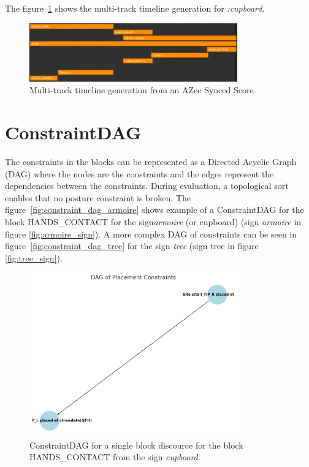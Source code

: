 \documentclass[../../main.tex]{subfiles}
\begin{document}
The figure~\ref{fig:azee_timeline} shows the multi-track timeline generation for \emph{:cupboard}.

\begin{figure}[h]
    \centering
    \includegraphics[width=0.8\textwidth]{chapters/multi_track/images/azee_timeline.png}
    \caption{Multi-track timeline generation from an AZee Synced Score.}
    \label{fig:azee_timeline}
\end{figure}


\section{ConstraintDAG}
\label{ch:multi_track:constraint_dag}



The constraints in the blocks can be represented as a Directed Acyclic Graph (DAG) where the nodes are the constraints and the edges represent the dependencies between the constraints. During evaluation, a topological sort enables that no posture constraint is broken. The figure~\ref{fig:constraint_dag_armoire} shows example of a ConstraintDAG for the block HANDS_CONTACT for the sign\emph{armoire} (or cupboard) (sign \emph{armoire} in figure \ref{fig:armoire_sign}). A more complex DAG of constraints can be seen in figure~\ref{fig:constraint_dag_tree} for the sign \emph{tree} (sign tree in figure \ref{fig:tree_sign}).

\begin{figure}[h]
    \centering
    \includegraphics[width=0.8\textwidth]{chapters/multi_track/images/constraint_dag_cupboard.png}
    \caption{ConstraintDAG for a single block discource for the block HANDS\_CONTACT from the sign \emph{cupboard}.}
    \label{fig:constraint_dag_cupboard}
\end{figure}
\end{document}
